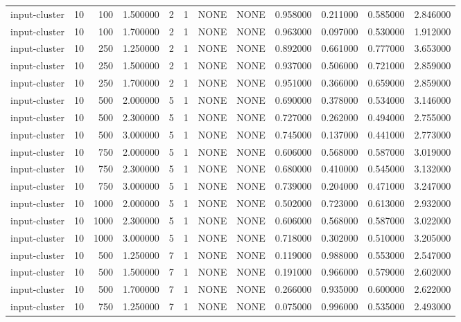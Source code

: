 \begin{tabular}{lrrrllllrrrr}
input-cluster & 10 & 100 & 1.500000 & 2 & 1 & NONE & NONE & 0.958000 & 0.211000 & 0.585000 & 2.846000 \\
input-cluster & 10 & 100 & 1.700000 & 2 & 1 & NONE & NONE & 0.963000 & 0.097000 & 0.530000 & 1.912000 \\
input-cluster & 10 & 250 & 1.250000 & 2 & 1 & NONE & NONE & 0.892000 & 0.661000 & 0.777000 & 3.653000 \\
input-cluster & 10 & 250 & 1.500000 & 2 & 1 & NONE & NONE & 0.937000 & 0.506000 & 0.721000 & 2.859000 \\
input-cluster & 10 & 250 & 1.700000 & 2 & 1 & NONE & NONE & 0.951000 & 0.366000 & 0.659000 & 2.859000 \\
input-cluster & 10 & 500 & 2.000000 & 5 & 1 & NONE & NONE & 0.690000 & 0.378000 & 0.534000 & 3.146000 \\
input-cluster & 10 & 500 & 2.300000 & 5 & 1 & NONE & NONE & 0.727000 & 0.262000 & 0.494000 & 2.755000 \\
input-cluster & 10 & 500 & 3.000000 & 5 & 1 & NONE & NONE & 0.745000 & 0.137000 & 0.441000 & 2.773000 \\
input-cluster & 10 & 750 & 2.000000 & 5 & 1 & NONE & NONE & 0.606000 & 0.568000 & 0.587000 & 3.019000 \\
input-cluster & 10 & 750 & 2.300000 & 5 & 1 & NONE & NONE & 0.680000 & 0.410000 & 0.545000 & 3.132000 \\
input-cluster & 10 & 750 & 3.000000 & 5 & 1 & NONE & NONE & 0.739000 & 0.204000 & 0.471000 & 3.247000 \\
input-cluster & 10 & 1000 & 2.000000 & 5 & 1 & NONE & NONE & 0.502000 & 0.723000 & 0.613000 & 2.932000 \\
input-cluster & 10 & 1000 & 2.300000 & 5 & 1 & NONE & NONE & 0.606000 & 0.568000 & 0.587000 & 3.022000 \\
input-cluster & 10 & 1000 & 3.000000 & 5 & 1 & NONE & NONE & 0.718000 & 0.302000 & 0.510000 & 3.205000 \\
input-cluster & 10 & 500 & 1.250000 & 7 & 1 & NONE & NONE & 0.119000 & 0.988000 & 0.553000 & 2.547000 \\
input-cluster & 10 & 500 & 1.500000 & 7 & 1 & NONE & NONE & 0.191000 & 0.966000 & 0.579000 & 2.602000 \\
input-cluster & 10 & 500 & 1.700000 & 7 & 1 & NONE & NONE & 0.266000 & 0.935000 & 0.600000 & 2.622000 \\
input-cluster & 10 & 750 & 1.250000 & 7 & 1 & NONE & NONE & 0.075000 & 0.996000 & 0.535000 & 2.493000 \\

\end{tabular}
